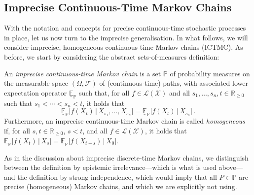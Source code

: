 \documentclass[graybox]{svmult}
\newcommand{\reals}{\mathbb{R}}
\newcommand{\realsnonneg}{\reals_{\geq 0}}
\newcommand{\states}{\mathcal{X}}
\newcommand{\gambles}{\mathcal{L}}
\newcommand{\gamblesX}{\gambles(\states)}
\begin{document}
\subsection{Imprecise Continuous-Time Markov Chains}

With the notation and concepts for precise continuous-time stochastic processes in place, let us now turn to the imprecise generalisation. In what follows, we will consider imprecise, homogeneous continuous-time Markov chains (ICTMC). As before, we start by considering the abstract sets-of-measures definition:
\begin{definition}\label{def:ictmc_set_measures}
An \emph{imprecise continuous-time Markov chain} is a set $\mathbb{P}$ of probability measures on the measurable space $(\Omega,\mathcal{F})$ of (continuous-time) paths, with associated lower expectation operator $\underline{\mathbb{E}}_\mathbb{P}$ such that, for all $f\in\gamblesX$ and all $s_1,\ldots,s_n,t\in\realsnonneg$ such that $s_1<\cdots<s_n<t$, it holds that
\begin{equation*}
\underline{\mathbb{E}}_\mathbb{P}\bigl[f(X_t)\,\big\vert\,X_{s_1},\ldots,X_{s_n}\bigr] = \underline{\mathbb{E}}_\mathbb{P}\bigl[f(X_t)\,\big\vert\,X_{s_n}\bigr]\,.
\end{equation*}
Furthermore, an imprecise continuous-time Markov chain is called \emph{homogeneous} if, for all $s,t\in\realsnonneg$, $s<t$, and all $f\in\gamblesX$, it holds that $\underline{\mathbb{E}}_\mathbb{P}\bigl[f(X_t)\,\big\vert\,X_s\bigr]=\underline{\mathbb{E}}_\mathbb{P}\bigl[f(X_{t-s})\,\big\vert\,X_0\bigr]$.
\end{definition}
As in the discussion about imprecise discrete-time Markov chains, we distinguish between the definition by epistemic irrelevance---which is what is used above---and the definition by strong independence, which would imply that all $P\in\mathbb{P}$ are precise (homogeneous) Markov chains, and which we are explicitly not using.
\end{document}
